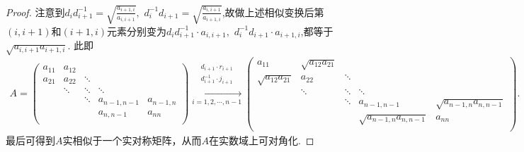 \documentclass[../../main.tex]{subfiles}%
\begin{document}
\begin{proof}
注意到$d_i d_{i+1}^{-1}=\sqrt{\frac{a_{i+1,i}}{a_{i,i+1}}},\,\,d_i^{-1} d_{i+1}=\sqrt{\frac{a_{i,i+1}}{a_{i+1,i}}}$,故做上述相似变换后第$(i,i+1)$和$(i+1,i)$元素分别变为$d_id_{i+1}^{-1}\cdot a_{i,i+1},\,\,d_{i}^{-1}d_{i+1}\cdot a_{i+1,i}$,都等于$\sqrt{a_{i,i+1}a_{i+1,i}}$.
此即
\begin{align*}
A=\left( \begin{matrix}
a_{11}&		a_{12}&		&		&		\\
a_{21}&		a_{22}&		\ddots&		&		\\
&		\ddots&		\ddots&		\ddots&		\\
&		&		\ddots&		a_{n-1,n-1}&		a_{n-1,n}\\
&		&		&		a_{n,n-1}&		a_{nn}\\
\end{matrix} \right) \xrightarrow[i=1,2,\cdots ,n-1]{\begin{array}{c}
d_{i+1}\cdot r_{i+1}\\
d_{i+1}^{-1}\cdot j_{i+1}\\
\end{array}}\left( \begin{matrix}
a_{11}&		\sqrt{a_{12}a_{21}}&		&		&		\\
\sqrt{a_{12}a_{21}}&		a_{22}&		\ddots&		&		\\
&		\ddots&		\ddots&		\ddots&		\\
&		&		\ddots&		a_{n-1,n-1}&		\sqrt{a_{n-1,n}a_{n,n-1}}\\
&		&		&		\sqrt{a_{n-1,n}a_{n,n-1}}&		a_{nn}\\
\end{matrix} \right) .
\end{align*}
最后可得到\(A\)实相似于一个实对称矩阵，从而\(A\)在实数域上可对角化.

\end{proof}
\end{document}

